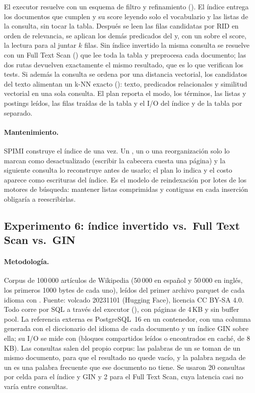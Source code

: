 El executor resuelve  con un esquema de filtro y refinamiento
(). El índice entrega los documentos que cumplen y su score leyendo
solo el vocabulario y las listas de la consulta, sin tocar la tabla. Después se leen las
filas candidatas por RID en orden de relevancia, se aplican los demás predicados del
 y, con un  sobre el score, la lectura para al juntar $k$ filas. Sin
índice invertido la misma consulta se resuelve con un Full Text Scan ()
que lee toda la tabla y preprocesa cada documento; las dos rutas devuelven exactamente el
mismo resultado, que es lo que verifican los tests. Si además la consulta se ordena por una
distancia vectorial, los candidatos del texto alimentan un k-NN exacto
(): texto, predicados relacionales y similitud vectorial en una sola
consulta. El plan reporta el modo, los términos, las listas y postings leídos, las filas
traídas de la tabla y el I/O del índice y de la tabla por separado.

\paragraph{Mantenimiento.} SPIMI construye el índice de una vez. Un , un
 o una reorganización solo lo marcan como desactualizado (escribir la cabecera
cuesta una página) y la siguiente consulta  lo reconstruye antes de usarlo; el
plan lo indica y el costo aparece como escrituras del índice. Es el modelo de reindexación
por lotes de los motores de búsqueda: mantener listas comprimidas y contiguas en cada
inserción obligaría a reescribirlas.

\subsection{Experimento 6: índice invertido vs.\ Full Text Scan vs.\ GIN}

\paragraph{Metodología.} Corpus de 100\,000 artículos de Wikipedia (50\,000 en español y
50\,000 en inglés, los primeros 1000 bytes de cada uno), leídos del primer archivo parquet
de cada idioma con . Fuente: volcado
 20231101 (Hugging Face), licencia CC BY-SA 4.0. Todo corre por SQL a través del executor
(), con páginas de 4\,KB y sin buffer pool. La
referencia externa es PostgreSQL~16 en un contenedor, con una columna
 generada con el diccionario del idioma de cada documento y un índice GIN
sobre ella; su I/O se mide con  (bloques compartidos leídos
o encontrados en caché, de 8\,KB). Las consultas salen del propio corpus: las palabras de
un  se toman de un mismo documento, para que el resultado no quede vacío, y la
palabra negada de un  es una palabra frecuente que ese documento no tiene. Se
usaron 20 consultas por celda para el índice y GIN y 2 para el Full Text Scan, cuya
latencia casi no varía entre consultas.

